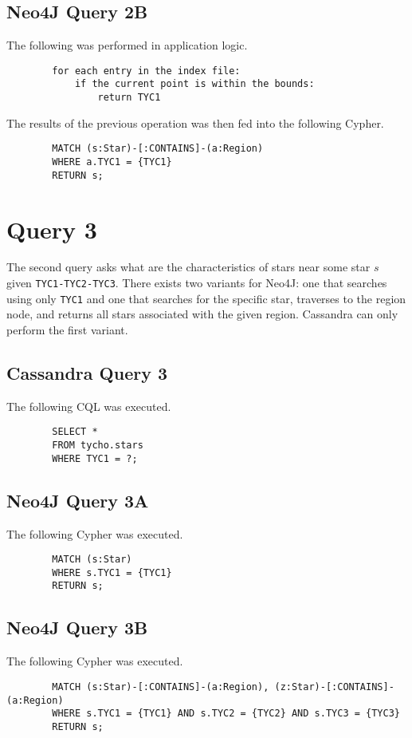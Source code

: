 \documentclass[11pt]{article}
\begin{document}
    \subsection{Neo4J Query 2B}\label{subsec:neo4jQuery2b}
    The following was performed in application logic.
    \begin{lstlisting}
        for each entry in the index file:
            if the current point is within the bounds:
                return TYC1
    \end{lstlisting}

    The results of the previous operation was then fed into the following Cypher.
    \begin{lstlisting}
        MATCH (s:Star)-[:CONTAINS]-(a:Region)
        WHERE a.TYC1 = {TYC1}
        RETURN s;
    \end{lstlisting}

    \section{Query 3}\label{sec:query3}
    The second query asks what are the characteristics of stars near some star $s$ given \texttt{TYC1-TYC2-TYC3}.
    There exists two variants for Neo4J: one that searches using only \texttt{TYC1} and one that searches for
    the specific star, traverses to the region node, and returns all stars associated with the given region.
    Cassandra can only perform the first variant.

    \subsection{Cassandra Query 3}\label{subsec:cassandraQuery3}
    The following CQL was executed.
    \begin{lstlisting}
        SELECT *
        FROM tycho.stars
        WHERE TYC1 = ?;
    \end{lstlisting}

    \subsection{Neo4J Query 3A}\label{subsec:neo4jQuery3a}
    The following Cypher was executed.
    \begin{lstlisting}
        MATCH (s:Star)
        WHERE s.TYC1 = {TYC1}
        RETURN s;
    \end{lstlisting}

    \subsection{Neo4J Query 3B}\label{subsec:neo4jQuery3b}
    The following Cypher was executed.
    \begin{lstlisting}
        MATCH (s:Star)-[:CONTAINS]-(a:Region), (z:Star)-[:CONTAINS]-(a:Region)
        WHERE s.TYC1 = {TYC1} AND s.TYC2 = {TYC2} AND s.TYC3 = {TYC3}
        RETURN s;
    \end{lstlisting}
\end{document}
